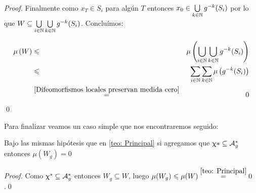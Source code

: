 \begin{proof}
	Finalmente como $x_{T} \in S_i$ para alg\'un $T$ entonces $x_0 \in \Bigcup{k \in \N}{g^{-k}(S_i)}$ por lo que $W \subseteq \Bigcup{i \in \N}{\Bigcup{k \in \N}{g^{-k}(S_i)}}$. Conclu\'imos:
	
	\begin{equation*}
	\begin{aligned}
	\mu \left(W\right) & \le & \mu \left(\Bigcup{i \in \N}{\Bigcup{k \in \N}{g^{-k}(S_i)}} \right) \\
	& \le & \Bigsum{i \in \N}{\Bigsum{k \in \N}{\mu \left(g^{-k}(S_i)\right)}} \\
	& \stackrel{\ref{Difeomorfismos locales preservan medida cero}}{=} & 0
	\end{aligned}
	\end{equation*}\qed
	
	
\end{proof}

Para finalizar veamos un caso simple que nos encontraremos seguido:

\begin{corollary}
	\label{coro: Resultado principal}
	Bajo las mismas hip\'otesis que en \ref{teo: Principal} si agregamos que $\mani* \subseteq \puntosfijos$ entonces $\mu(W_g) =0$
\end{corollary}

\begin{proof}
	Como $\mani^* \subseteq \puntosfijos$ entonces $W_g \subseteq W$, luego $\mu(W_g) \le \mu (W) \stackrel{\ref{teo: Principal}}{=} 0$.\qed
\end{proof}